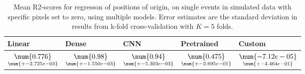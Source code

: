 \begin{table}
\centering
\caption{
Mean R2-scores for regresson of positions of origin, on single events in simulated data with specific pixels
set to zero, using multiple models. 
Error estimates are the standard deviation in results from k-fold cross-validation 
with $K=5$ folds.
}
\label{tab:regression-simulated-single-position-pixelmod-r2}
\begin{tabular}{lllll}
\toprule
                                             Linear &                                              Dense &                                                CNN &                                          Pretrained &                                                  Custom \\
\midrule
 $\underset{\num{+- 2.725e-03 }  }{\num{ 0.776 } }$ &  $\underset{\num{+- 1.550e-03 }  }{\num{ 0.98 } }$ &  $\underset{\num{+- 5.303e-03 }  }{\num{ 0.94 } }$ &  $\underset{\num{+- 2.695e-01 }  }{\num{ 0.475 } }$ &  $\underset{\num{+- 4.464e-01 }  }{\num{ -7.12e-05 } }$ \\
\bottomrule
\end{tabular}
\end{table}
